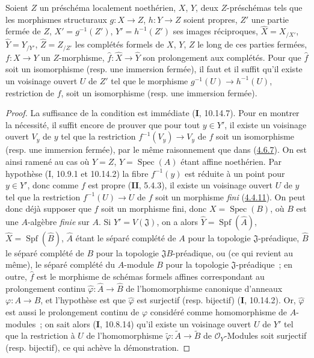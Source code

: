 \begin{proposition}[4.6.8]
\label{III.4.6.8-fr}
Soient $Z$ un préschéma localement noethérien, $X$, $Y$, deux $Z$-préschémas
tels que les morphismes structuraux $g:X\to Z$, $h:Y\to Z$ soient propres,
$Z'$ une partie fermée de $Z$, $X'=g^{-1}(Z')$, $Y'=h^{-1}(Z')$ ses images
réciproques,
$\widehat X=X_{/X'}$, $\widehat Y=Y_{/Y'}$, $\widehat Z=Z_{/Z'}$
les complétés formels de $X$, $Y$, $Z$ le long de ces parties fermées,
$f:X\to Y$ un $Z$-morphisme, $\widehat f:\widehat X\to\widehat Y$ son
prolongement aux complétés. Pour que $\widehat f$ soit un isomorphisme (\textup{resp.}
une immersion fermée), il faut et il suffit qu'il existe un voisinage ouvert
$U$ de $Z'$ tel que le morphisme $g^{-1}(U)\to h^{-1}(U)$, restriction de
$f$, soit un isomorphisme (\textup{resp.} une immersion fermée).
\end{proposition}

\begin{proof}
La suffisance de la condition est immédiate (\textbf{I}, 10.14.7). Pour en montrer la
nécessité, il suffit encore de prouver que pour tout $y\in Y'$, il existe un
voisinage ouvert $V_y$ de $y$ tel que la restriction
$f^{-1}(V_y)\to V_y$ de $f$ soit un isomorphisme (resp. une immersion
fermée), par le même raisonnement que dans
(\hyperref[III.4.6.7-fr]{4.6.7}). On est ainsi ramené au cas où $Y=Z$,
$Y=\operatorname{Spec}(A)$ étant affine noethérien. Par hypothèse
(I, 10.9.1 et 10.14.2) la fibre $f^{-1}(y)$ est réduite à un point pour
$y\in Y'$, donc comme $f$ est propre (\textbf{II}, 5.4.3), il existe un voisinage
ouvert $U$ de $y$ tel que la restriction $f^{-1}(U)\to U$ de $f$ soit un
morphisme \emph{fini} (\hyperref[III.4.4.11-fr]{4.4.11}). On peut donc déjà supposer
que $f$ soit un morphisme fini, donc $X=\operatorname{Spec}(B)$, où $B$ est
une $A$-algèbre \emph{finie} sur $A$. Si $Y'=V(\mathfrak J)$, on a alors
$\widehat Y=\operatorname{Spf}(\widehat A)$, $\widehat X=\operatorname{Spf}(\widehat B)$,
$\widehat A$ étant le séparé complété de $A$ pour la topologie
$\mathfrak J$-préadique, $\widehat B$ le séparé complété de $B$ pour la
topologie $\mathfrak JB$-préadique, ou (ce qui revient au même), le séparé
complété du $A$-module $B$ pour la topologie $\mathfrak J$-préadique~; en
outre, $\widehat f$ est le morphisme de schémas formels affines correspondant
au prolongement continu $\widehat\varphi:\widehat A\to\widehat B$ de
l'homomorphisme canonique d'anneaux $\varphi:A\to B$, et l'hypothèse est que
$\widehat\varphi$ est surjectif (resp. bijectif) (\textbf{I}, 10.14.2). Or,
$\widehat\varphi$ est aussi le prolongement continu de $\varphi$ considéré
comme homomorphisme de $A$-modules~; on sait alors (\textbf{I}, 10.8.14) qu'il existe
un voisinage ouvert $U$ de $Y'$ tel que la restriction à $U$ de
l'homomorphisme $\widetilde\varphi:\widetilde A\to\widetilde B$ de
$\mathcal O_Y$-Modules soit surjectif (resp. bijectif), ce qui achève la
démonstration.
\end{proof}

